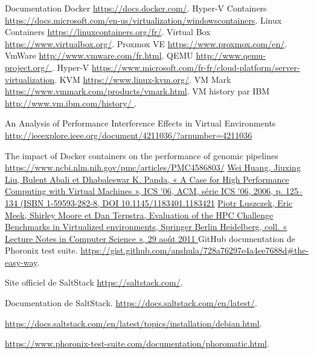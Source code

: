 \documentclass[a4paper]{report}
\begin{document}
\newpage
\begin{thebibliography}{9}

          Documentation Docker
          \url{https://docs.docker.com/}.
          Hyper-V Containers
          \url{https://docs.microsoft.com/en-us/virtualization/windowscontainers}.
         Linux Containers
         \url{https://linuxcontainers.org/fr/}.
         Virtual Box
         \url{ https://www.virtualbox.org/}.
         Proxmox VE
         \url{https://www.proxmox.com/en/}.
         VmWare
         \url{ http://www.vmware.com/fr.html}.
         QEMU
         \url{http://www.qemu-project.org/   }.
         Hyper-V
         \url{https://www.microsoft.com/fr-fr/cloud-platform/server-virtualization}.      
         KVM
         \url{https://www.linux-kvm.org/}.
         VM Mark
         \url{https://www.vmmark.com/products/vmark.html}. 
         VM history par IBM
         \url{http://www.vm.ibm.com/history/ }.
 
          An Analysis of Performance Interference Effects in Virtual Environments
          \url{http://ieeexplore.ieee.org/document/4211036/?arnumber=4211036}
      
          The impact of Docker containers on the performance of genomic pipelines
          \url {https://www.ncbi.nlm.nih.gov/pmc/articles/PMC4586803/}              
          \url{Wei Huang, Jiuxing Liu, Bulent Abali et Dhabaleswar K. Panda, « A Case for High Performance Computing with Virtual Machines », ICS '06, ACM, série ICS '06,‎ 2006, p. 125–134 (ISBN 1-59593-282-8, DOI 10.1145/1183401.1183421}      
          \url{Piotr Luszczek, Eric Meek, Shirley Moore et Dan Terpstra, Evaluation of the HPC Challenge Benchmarks in Virtualized environments, Springer Berlin Heidelberg, coll. « Lecture Notes in Computer Science », 29 août 2011 }
         GitHub documentation de Phoronix test suite.
          \url{https://gist.github.com/anshula/728a76297e4a4ee7688d#the-easy-way}.
          
        Site officiel de SaltStack
          \url{https://saltstack.com/}.

         Documentation de SaltStack.
          \url{https://docs.saltstack.com/en/latest/}.
          
       
          \url{https://docs.saltstack.com/en/latest/topics/installation/debian.html}.

       
          \url{https://www.phoronix-test-suite.com/documentation/phoromatic.html}.
\end{thebibliography}
\end{document}
